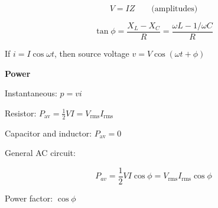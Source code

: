 \documentclass[10pt]{article}
\newcommand\heading[1]{\medskip\textbf{#1}\medskip}
\begin{document}
\begin{multicols*}{3}
\[V=IZ \qquad \text{(amplitudes)}\]

\[\tan\phi=\frac{X_L-X_C}{R}=\frac{\omega L-1/\omega C}{R}\]

If $i=I\cos\omega t$, then source voltage $v=V\cos(\omega t+\phi)$

\heading{Power}

Instantaneous: $p=vi$

Resistor: $P_{\text{av}}=\frac12 VI=V_{\text{rms}}I_{\text{rms}}$

Capacitor and inductor: $P_{\text{av}}=0$

General AC circuit:

\[P_{av}=\frac12 VI\cos\phi=V_{\text{rms}}I_{\text{rms}}\cos\phi\]

Power factor: $\cos\phi$

\end{multicols*}
\end{document}
